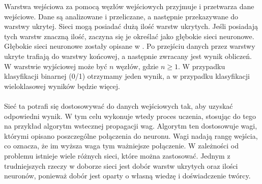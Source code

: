 Warstwa wejściowa za pomocą węzłów wejściowych przyjmuje i przetwarza dane wejściowe. Dane są analizowane i przeliczane, a następnie przekazywane do warstwy ukrytej. Sieci mogą posiadać dużą ilość warstw ukrytych. Jeśli posiadają tych warstw znaczną ilość, zaczyna się je określać jako głębokie sieci neuronowe. Głębokie sieci neuronowe zostały opisane w . Po przejściu danych przez warstwy ukryte trafiają do warstwy końcowej, a następnie zwracany jest wynik obliczeń. W warstwie wyjściowej może być $n$ węzłów, gdzie $n \geq 1$. W przypadku klasyfikacji binarnej (0/1) otrzymamy jeden wynik, a w przypadku klasyfikacji wieloklasowej wyników będzie więcej.
\\ \\
Sieć ta potrafi się dostosowywać do danych wejściowych tak, aby uzyskać odpowiedni wynik. W tym celu wykonuje wtedy proces uczenia, stosując do tego na przykład algorytm wstecznej propagacji wag. Algorytm ten dostosowuje wagi, którymi opisano poszczególne połączenia do neuronu. Wagi nadają rangę wejścia, co oznacza, że im wyższa waga tym ważniejsze połączenie. W zależności od problemu istnieje wiele różnych sieci, które można zastosować. Jednym z trudniejszych rzeczy w doborze sieci jest dobór warstw ukrytych oraz ilości neuronów, ponieważ dobór jest oparty o własną wiedzę i doświadczenie twórcy.

